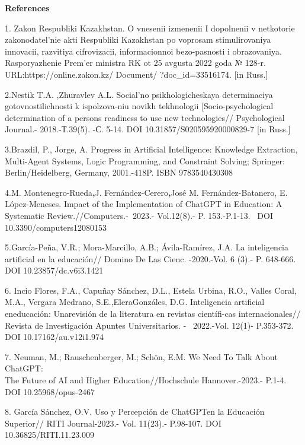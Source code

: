 \begin{center}
	{\bfseries References}
\end{center}
\begin{noparindent}

1. Zakon Respubliki Kazakhstan. O vnesenii izmenenii I dopolnenii v
netkotorie zakonodatel'nie akti Respubliki Kazakhstan po voprosam
stimulirovaniya innovacii, razvitiya cifrovizacii, informacionnoi
bezo-pasnosti i obrazovaniya. Rasporyazhenie Prem'er ministra RK ot 25
avgusta 2022 goda № 128-r. \\URL:https://online.zakon.kz/ Document/
?doc\_id=33516174. {[}in Russ.{]}

2.Nestik T.A. ,Zhuravlev A.L. Social'no psikhologicheskaya determinaciya
gotovnostilichnosti k ispolzova-niu novikh tekhnologii
{[}Socio-psychological determination of a person\textquotesingle s
readiness to use new technologies// Psychological Journal.-
2018.-Т.39(5). -С. 5-14. DOI 10.31857/S020595920000829-7 {[}in Russ.{]}

3.Brazdil, P., Jorge, A. Progress in Artificial Intelligence: Knowledge
Extraction, Multi-Agent Systems, Logic Programming, and Constraint
Solving; Springer: Berlin/Heidelberg, Germany, 2001.-418P. ISBN
9783540430308

4.M. Montenegro-Rueda{\bfseries ,}J. Fernández-Cerero{\bfseries ,}José M.
Fernández-Batanero, E. López-Meneses. Impact of the Implementation of
ChatGPT in Education: A Systematic Review.//Computers.-\emph{~}2023.-
Vol.12(8).- P. 153.-P.1-13. ~DOI 10.3390/computers12080153

5.García-Peña, V.R.; Mora-Marcillo, A.B.; Ávila-Ramírez, J.A. La
inteligencia artificial en la educación// Domino De Las Cienc.
-2020.-Vol. 6 (3).- P. 648-666. DOI 10.23857/dc.v6i3.1421

6. Incio Flores, F.A., Capuñay Sánchez, D.L., Estela Urbina, R.O.,
Valles Coral, M.A., Vergara Medrano, S.E.,EleraGonzáles, D.G.
Inteligencia artificial eneducación: Unarevisión de la literatura en
revistas científi-cas internacionales// Revista de Investigación Apuntes
Universitarios. - ~2022.-Vol. 12(1)- P.353-372. DOI
10.17162/au.v12i1.974

7. Neuman, M.; Rauschenberger, M.; Schön, E.M. We Need To Talk About
ChatGPT:\\The Future of AI and Higher Education//Hochschule
Hannover.-2023.- P.1-4. DOI 10.25968/opus-2467

8. García Sánchez, O.V. Uso y Percepción de ChatGPTen la Educación
Superior// RITI Journal-2023.- Vol. 11(23).- P.98-107. DOI 10.36825/RITI.11.23.009


\end{noparindent}
